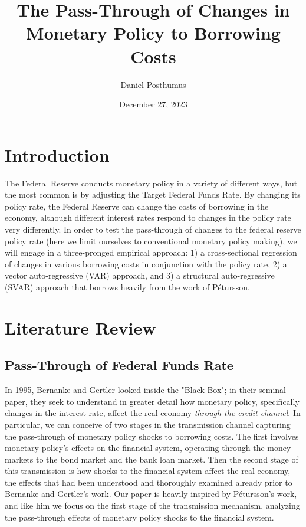 \documentclass[12pt,final]{article}
\title{The Pass-Through of Changes in Monetary Policy to Borrowing Costs}
\author{Daniel Posthumus}
\date{December 27, 2023}
\begin{document}
\vspace{-2in}
\maketitle
\vspace{-0.75in}
\section{Introduction}



The Federal Reserve conducts monetary policy in a variety of different ways, but the most common is by adjusting the Target Federal Funds Rate. By changing its policy rate, the Federal Reserve can change the costs of borrowing in the economy, although different interest rates respond to changes in the policy rate very differently. In order to test the pass-through of changes to the federal reserve policy rate (here we limit ourselves to conventional monetary policy making), we will engage in a three-pronged empirical approach: 1) a cross-sectional regression of changes in various borrowing costs in conjunction with the policy rate, 2) a vector auto-regressive (VAR) approach, and 3) a structural auto-regressive (SVAR) approach that borrows heavily from the work of Pétursson. \citep{Petursson2001}

\section{Literature Review}
\subsection{Pass-Through of Federal Funds Rate}
In 1995, Bernanke and Gertler looked inside the "Black Box"; in their seminal paper, they seek to understand in greater detail how monetary policy, specifically changes in the interest rate, affect the real economy \textit{through the credit channel}. \citep{Bernanke1995} In particular, we can conceive of two stages in the transmission channel capturing the pass-through of monetary policy shocks to borrowing costs. The first involves monetary policy's effects on the financial system, operating through the money markets to the bond market and the bank loan market. Then the second stage of this transmission is how shocks to the financial system affect the real economy, the effects that had been understood and thoroughly examined already prior to Bernanke and Gertler's work. Our paper is heavily inspired by Pétursson's work, and like him we focus on the first stage of the transmission mechanism, analyzing the pass-through effects of monetary policy shocks to the financial system. \citep{Petursson2001}
\end{document}
